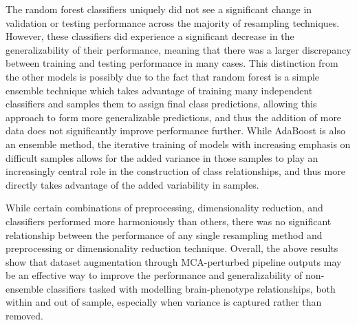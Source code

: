 \documentclass[num-refs]{nbdt-article}
\begin{document}
The random forest classifiers uniquely did not see a significant change in validation or testing performance across the majority of resampling techniques. However, these classifiers did experience a significant decrease in the generalizability of their performance, meaning that there was a larger discrepancy between training and testing performance in many cases. This distinction from the other models is possibly due to the fact that random forest is a simple ensemble technique which takes advantage of training many independent classifiers and samples them to assign final class predictions, allowing this approach to form more generalizable predictions, and thus the addition of more data does not significantly improve performance further. While AdaBoost is also an ensemble method, the iterative training of models with increasing emphasis on difficult samples allows for the added variance in those samples to play an increasingly central role in the construction of class relationships, and thus more directly takes advantage of the added variability in samples.

While certain combinations of preprocessing, dimensionality reduction, and classifiers performed more harmoniously than others, there was no significant relationship between the performance of any single resampling method and preprocessing or dimensionality reduction technique. Overall, the above results show that dataset augmentation through MCA-perturbed pipeline outputs may be an effective way to improve the performance and generalizability of non-ensemble classifiers tasked with modelling brain-phenotype relationships, both within and out of sample, especially when variance is captured rather than removed.
\end{document}
